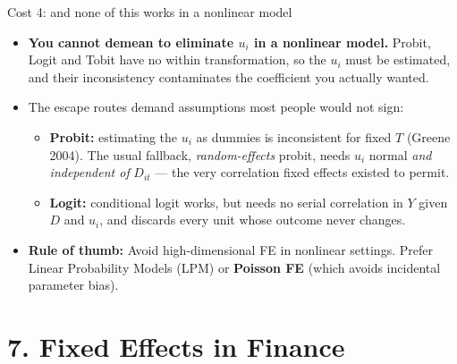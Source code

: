 \documentclass[
  11pt,
  ignorenonframetext,
  aspectratio=169,
]{beamer}
\newcounter{none} %
\providecommand{\tightlist}{%
  \setlength{\itemsep}{0pt}\setlength{\parskip}{0pt}}
\begin{document}
\begin{frame}{Cost 4: and none of this works in a nonlinear model}
\protect{}\label{cost-4-and-none-of-this-works-in-a-nonlinear-model}
\begin{itemize}
\tightlist
\item
  \textbf{You cannot demean to eliminate \(u_i\) in a nonlinear model.}
  Probit, Logit and Tobit have no within transformation, so the \(u_i\)
  must be estimated, and their inconsistency contaminates the
  coefficient you actually wanted.
\item
  The escape routes demand assumptions most people would not sign:

  \begin{itemize}
  \tightlist
  \item
    \textbf{Probit:} estimating the \(u_i\) as dummies is inconsistent
    for fixed \(T\) (Greene 2004). The usual fallback,
    \emph{random-effects} probit, needs \(u_i\) normal \emph{and
    independent of} \(D_{it}\) --- the very correlation fixed effects
    existed to permit.
  \item
    \textbf{Logit:} conditional logit works, but needs no serial
    correlation in \(Y\) given \(D\) and \(u_i\), and discards every
    unit whose outcome never changes.
  \end{itemize}
\end{itemize}

\vspace{0.3em}

\begin{itemize}
\tightlist
\item
  \textbf{Rule of thumb:} Avoid high-dimensional FE in nonlinear
  settings. Prefer Linear Probability Models (LPM) or \textbf{Poisson
  FE} (which avoids incidental parameter bias).
\end{itemize}
\end{frame}

\section{7. Fixed Effects in Finance}\label{fixed-effects-in-finance}
\end{document}
